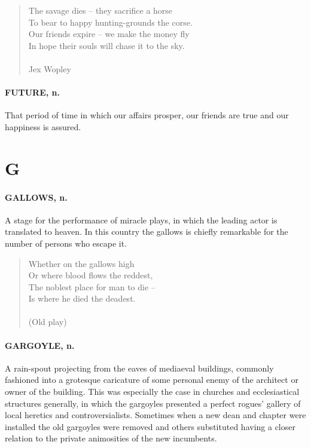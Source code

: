 \documentclass[11pt]{article}
\begin{document}
\begin{quote}   The savage dies -- they sacrifice a horse \\
  To bear to happy hunting-grounds the corse. \\
  Our friends expire -- we make the money fly \\
  In hope their souls will chase it to the sky. \\
 \\
Jex Wopley \end{quote}


\paragraph{FUTURE, n.}  That period of time in which our affairs prosper, our
friends are true and our happiness is assured.



\section*{G}



\paragraph{GALLOWS, n.}  A stage for the performance of miracle plays, in which
the leading actor is translated to heaven.  In this country the
gallows is chiefly remarkable for the number of persons who escape it.

\begin{quote}   Whether on the gallows high \\
      Or where blood flows the reddest, \\
  The noblest place for man to die -- \\
      Is where he died the deadest. \\
 \\
(Old play) \end{quote}


\paragraph{GARGOYLE, n.}  A rain-spout projecting from the eaves of mediaeval
buildings, commonly fashioned into a grotesque caricature of some
personal enemy of the architect or owner of the building.  This was
especially the case in churches and ecclesiastical structures
generally, in which the gargoyles presented a perfect rogues' gallery
of local heretics and controversialists.  Sometimes when a new dean
and chapter were installed the old gargoyles were removed and others
substituted having a closer relation to the private animosities of the
new incumbents.
\end{document}
